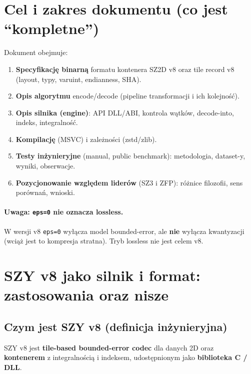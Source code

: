 \documentclass[11pt,a4paper]{article}
\begin{document}
\section{Cel i zakres dokumentu (co jest ``kompletne'')}
Dokument obejmuje:
\begin{enumerate}
  \item \textbf{Specyfikację binarną} formatu kontenera SZ2D v8 oraz tile record v8 (layout, typy, varuint, endianness, SHA).
  \item \textbf{Opis algorytmu} encode/decode (pipeline transformacji i ich kolejność).
  \item \textbf{Opis silnika (engine)}: API DLL/ABI, kontrola wątków, decode-into, indeks, integralność.
  \item \textbf{Kompilację} (MSVC) i zależności (zstd/zlib).
  \item \textbf{Testy inżynieryjne} (manual, public benchmark): metodologia, dataset-y, wyniki, obserwacje.
  \item \textbf{Pozycjonowanie względem liderów} (SZ3 i ZFP): różnice filozofii, sens porównań, wnioski.
\end{enumerate}

\paragraph{Uwaga: \texttt{eps=0} nie oznacza lossless.}
W wersji v8 \texttt{eps=0} wyłącza model bounded-error, ale \textbf{nie} wyłącza kwantyzacji (wciąż jest to kompresja stratna). Tryb lossless nie jest celem v8.

\section{SZY v8 jako silnik i format: zastosowania oraz nisze}

\subsection{Czym jest SZY v8 (definicja inżynieryjna)}
SZY v8 jest \textbf{tile-based bounded-error codec} dla danych 2D oraz \textbf{kontenerem} z integralnością i indeksem, udostępnionym jako \textbf{biblioteka C / DLL}.
\end{document}
